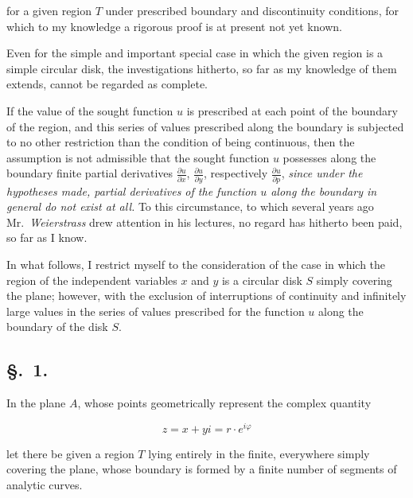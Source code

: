 \documentclass{article}
\begin{document}
for a given region $T$ under prescribed boundary and discontinuity conditions, for which to my knowledge a rigorous proof is at present not yet known.




Even for the simple and important special case in which the given region is a simple circular disk, the investigations hitherto, so far as my knowledge of them extends, cannot be regarded as complete.



If the value of the sought function $u$ is prescribed at each point of the boundary of the region, and this series of values prescribed along the boundary is subjected to no other restriction than the condition of being continuous, then the assumption is not admissible that the sought function $u$ possesses along the boundary finite partial derivatives $\frac{\partial u}{\partial x}$, $\frac{\partial u}{\partial y}$, respectively $\frac{\partial u}{\partial p}$, \emph{since under the hypotheses made, partial derivatives of the function $u$ along the boundary in general do not exist at all.} To this circumstance, to which several years ago Mr.~\emph{Weierstrass} drew attention in his lectures, no regard has hitherto been paid, so far as I know.



In what follows, I restrict myself to the consideration of the case in which the region of the independent variables $x$ and $y$ is a circular disk $S$ simply covering the plane; however, with the exclusion of interruptions of continuity and infinitely large values in the series of values prescribed for the function $u$ along the boundary of the disk $S$.



\subsection*{§.~1.}



In the plane $A$, whose points geometrically represent the complex quantity

\[

z = x + yi = r \cdot e^{i\varphi}

\]

let there be given a region $T$ lying entirely in the finite, everywhere simply covering the plane, whose boundary is formed by a finite number of segments of analytic curves.
\end{document}
